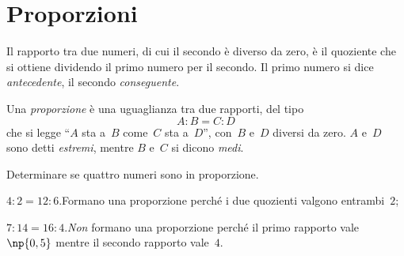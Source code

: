 \ovalbox{\risolvii \ref{ese:3.85}, \ref{ese:3.86}, \ref{ese:3.87}, \ref{ese:3.88}, \ref{ese:3.89}, \ref{ese:3.90},
\ref{ese:3.91}, \ref{ese:3.92}, \ref{ese:3.93}, \ref{ese:3.94}, \ref{ese:3.95}, \ref{ese:3.96},
\ref{ese:3.97},}

\vspazio\ovalbox{\ref{ese:3.98},\ref{ese:3.99}, \ref{ese:3.100}, \ref{ese:3.101}, \ref{ese:3.102}, \ref{ese:3.103}, \ref{ese:3.104},
\ref{ese:3.105}, \ref{ese:3.106}, \ref{ese:3.107}, \ref{ese:3.108}, \ref{ese:3.109}, \ref{ese:3.110}, \ref{ese:3.111},}

\vspazio\ovalbox{\ref{ese:3.112}, \ref{ese:3.113}, \ref{ese:3.114}, \ref{ese:3.115}, \ref{ese:3.116}}

\section{Proporzioni}

\begin{definizione}
 Il rapporto tra due numeri, di cui il secondo è diverso da zero, è il quoziente che si ottiene dividendo
il primo numero per il secondo. Il primo numero si dice \emph{antecedente}, il secondo \emph{conseguente}.
\end{definizione}

\begin{center}
  
\end{center}

\begin{definizione}
 Una \emph{proporzione} è una uguaglianza tra due rapporti, del tipo
\[A: B = C: D\]
che si legge ``$A$ sta a~$B$ come~$C$ sta a~$D$'', con~$B$ e~$D$ diversi da zero. $A$ e~$D$ sono detti \emph{estremi}, mentre $B$ e~$C$ si dicono \emph{medi}.
\end{definizione}

\begin{center}
  
\end{center}

\begin{exrig}
\begin{esempio}
Determinare se quattro numeri sono in proporzione.
\begin{itemize*}
  \item $4:2=12:6$.\quad Formano una proporzione perché i due quozienti valgono entrambi~$2$;
  \item $7:14=16:4$.\quad \emph{Non} formano una proporzione perché il primo rapporto vale~$\np{0,5}$ mentre il secondo rapporto vale~$4$.
\end{itemize*}
\end{esempio}
\end{exrig}

